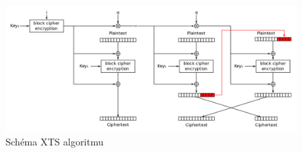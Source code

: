 \begin{figure}[h]
    \centering
    \includegraphics[width=1\textwidth]{XTS_mode_encryption}
    \caption{Schéma XTS algoritmu}
    \label{fig:XTS}
\end{figure}
